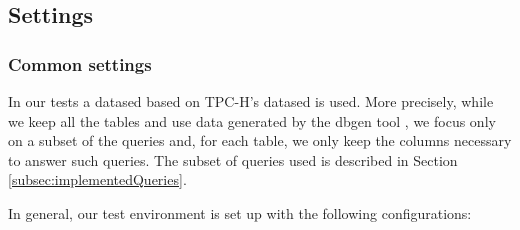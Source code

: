 \documentclass{vldb}
\newcommand{\grumbler}[2]{{\color{red}{\bf #1:} #2}}
\renewcommand{\grumbler}[2]{}
\newcommand{\andre}[1]{\grumbler{andre}{#1}}
\begin{document}

\subsection{Settings}

\subsubsection{Common settings}
\label{subsubsec:commonSettings}

In our tests a datased based on TPC-H's datased \cite{tpch} is used.
More precisely, while we keep all the tables and use data generated by the dbgen tool \cite{tpch}, we focus only on a subset of the queries and, for each table, we only keep the columns necessary to answer such queries.
The subset of queries used is described in Section \ref{subsec:implementedQueries}.


In general, our test environment is set up with the following configurations:

\andre{Proper reference to the Grid project (on the website they list how to refer to them)}
\end{document}
